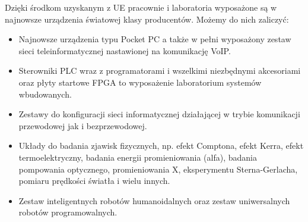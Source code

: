 \documentclass[a4paper,12pt]{article}
\begin{document}
Dzięki środkom uzyskanym z UE pracownie i laboratoria wyposażone są w najnowsze urządzenia światowej
klasy producentów. Możemy do nich zaliczyć:

\begin {itemize}
\item Najnowsze urządzenia typu Pocket PC a także w pełni wyposażony zestaw sieci teleinformatycznej
nastawionej na komunikację VoIP.
\item Sterowniki PLC wraz z programatorami i wszelkimi niezbędnymi akcesoriami oraz płyty startowe FPGA to wyposażenie laboratorium systemów wbudowanych.
\item Zestawy do konfiguracji sieci informatycznej działającej w trybie komunikacji przewodowej jak i bezprzewodowej.
\item Układy do badania zjawisk fizycznych, np. efekt Comptona, efekt Kerra, efekt termoelektryczny, badania
energii promieniowania (alfa), badania pompowania optycznego, promieniowania X, eksperymentu
Sterna-Gerlacha, pomiaru prędkości światła i wielu innych.
\item Zestaw inteligentnych robotów humanoidalnych oraz zestaw uniwersalnych robotów programowalnych.
\end {itemize}
\end{document}
